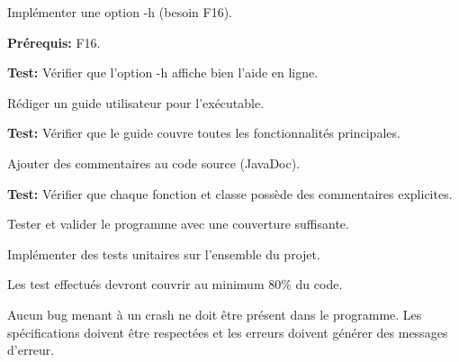 \documentclass{article}
\begin{document}
\begin{nonfunctionnalneedbox}[F5. Documentation]
    
    \begin{subneedbox}[F5.1: Option -h]
        Implémenter une option -h (besoin F16).

        \textbf{Prérequis:} F16.

        \textbf{Test:} Vérifier que l'option -h affiche bien l'aide en ligne.
    \end{subneedbox}
    
    \begin{subneedbox}
        Rédiger un guide utilisateur pour l'exécutable.

        \textbf{Test:} Vérifier que le guide couvre toutes les fonctionnalités principales.
    \end{subneedbox}
    
    \begin{subneedbox}
        Ajouter des commentaires au code source (JavaDoc).

        \textbf{Test:} Vérifier que chaque fonction et classe possède des commentaires explicites.
    \end{subneedbox}
\end{nonfunctionnalneedbox}

\begin{nonfunctionnalneedbox}[F6. Tests]
    Tester et valider le programme avec une couverture suffisante.
    \begin{subneedbox}[F6.1 Tests]
        Implémenter des tests unitaires sur l'ensemble du projet.
    \end{subneedbox}

    \begin{subneedbox}[F6.2 Coverage]
        Les test effectués devront couvrir au minimum 80\% du code.
    \end{subneedbox}
\end{nonfunctionnalneedbox}

\begin{nonfunctionnalneedbox}[F7: Bugs]
    Aucun bug menant à un crash ne doit être présent dans le programme. Les spécifications doivent être respectées et les erreurs doivent générer des messages d'erreur.
\end{nonfunctionnalneedbox}
\end{document}
